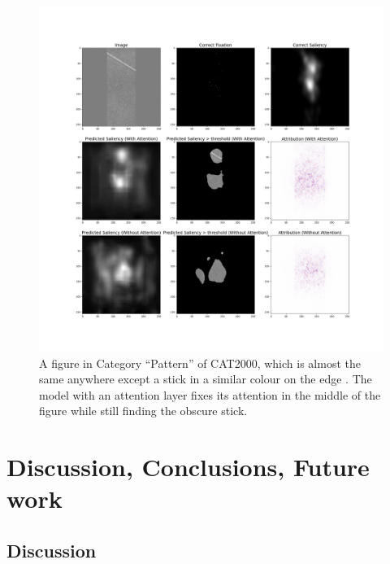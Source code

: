 \documentclass[12pt]{article}
\begin{document}
\begin{figure}[h!]
    \begin{adjustwidth}{-1cm}{}
    \centering
    \includegraphics[width=7in]{imgs/used_example_2.png}
    \end{adjustwidth}
    \caption{A figure in Category ``Pattern'' of CAT2000, which is almost the same anywhere except a stick in a similar colour on the edge . The model with an attention layer fixes its attention in the middle of the figure while still finding the obscure stick.}
    \label{img:int_example_2}
\end{figure}







\section{Discussion, Conclusions, Future work}
\subsection{Discussion}
\end{document}
